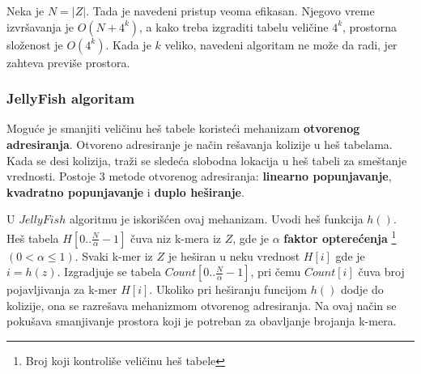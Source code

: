 \documentclass[12pt,oneside]{memoir}
\begin{document}
Neka je $N = |Z|$. Tada je navedeni pristup veoma efikasan. Njegovo vreme izvršavanja je $O(N + 4^k)$, a kako treba izgraditi tabelu veličine $4^k$, prostorna složenost je $O(4^k)$. Kada je $k$ veliko, navedeni algoritam ne može da radi, jer zahteva previše prostora.


\subsubsection{JellyFish algoritam}
Moguće je smanjiti veličinu heš tabele koristeći mehanizam \textbf{otvorenog adresiranja}. Otvoreno adresiranje je način rešavanja kolizije u heš tabelama. Kada se desi kolizija, traži se sledeća slobodna lokacija u heš tabeli za smeštanje vrednosti. Postoje 3 metode otvorenog adresiranja: \textbf{linearno popunjavanje}, \textbf{kvadratno popunjavanje} i \textbf{duplo heširanje}.

U $JellyFish$ algoritmu je iskorišćen ovaj mehanizam. Uvodi heš funkcija $h()$. Heš tabela $H[0..\frac{N}{\alpha} - 1]$ čuva niz k-mera iz $Z$, gde je $\alpha$ \textbf{faktor opterećenja}  \footnote{Broj koji kontroliše veličinu heš tabele} $(0 < \alpha \leq 1)$. Svaki k-mer iz $Z$ je heširan u neku vrednost $H[i]$ gde je $i = h(z)$. Izgradjuje se tabela $Count[0..\frac{N}{\alpha} - 1]$, pri čemu $Count[i]$ čuva broj pojavljivanja za k-mer $H[i]$. Ukoliko pri heširanju funcijom $h()$ dodje do kolizije, ona se razrešava mehanizmom otvorenog adresiranja. Na ovaj način se pokušava smanjivanje prostora koji je potreban za obavljanje brojanja k-mera.
\end{document}
